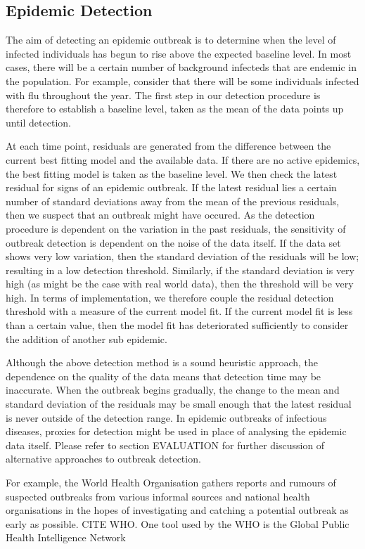 \subsection{Epidemic Detection}
The aim of detecting an epidemic outbreak is to determine when the
level of infected individuals has begun to rise above the expected
baseline level. In most cases, there will be a certain number of
background infecteds that are endemic in the population. For example,
consider that there will be some individuals infected with flu
throughout the year. The first step in our detection procedure is
therefore to establish a baseline level, taken as the mean of the data
points up until detection.

At each time point, residuals are generated from the difference
between the current best fitting model and the available data. If
there are no active epidemics, the best fitting model is taken as the
baseline level. We then check the latest residual for signs of an
epidemic outbreak. If the latest residual lies a certain number of
standard deviations away from the mean of the previous residuals, then
we suspect that an outbreak might have occured. As the detection
procedure is dependent on the variation in the past residuals, the sensitivity of
outbreak detection is dependent on the noise of the data itself. If
the data set shows very low variation, then the standard deviation of
the residuals will be low; resulting in a low detection
threshold. Similarly, if the standard deviation is very high (as might
be the case with real world data), then the threshold will be very
high. In terms of implementation, we therefore couple the residual
detection threshold with a measure of the current model fit. If the
current model fit is less than a certain value, then the model fit has
deteriorated sufficiently to consider the addition of another sub
epidemic.

Although the above detection method is a sound heuristic approach, the
dependence on the quality of the data means that detection time may
be inaccurate. When the outbreak begins gradually, the change to the
mean and standard deviation of the residuals may be small enough that
the latest residual is never outside of the detection
range. In epidemic outbreaks of infectious diseases, proxies for
detection might be used in place of analysing the epidemic data
itself. Please refer to section EVALUATION for further discussion of
alternative approaches to outbreak detection.


 For example, the World Health Organisation gathers reports and
rumours of suspected outbreaks from various informal sources and
national health organisations in the hopes of
investigating and catching a potential outbreak as early as
possible. CITE WHO. One tool used by the WHO is the Global Public
Health Intelligence Network




